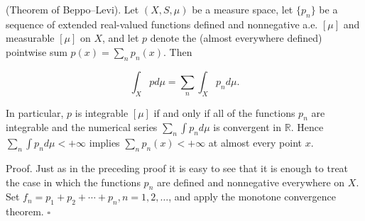 (Theorem of Beppo–Levi). Let $(X, S, \mu)$ be a measure space, let $\{p_n\}$ be a sequence of extended real-valued functions defined and nonnegative a.e. $[\mu]$ and measurable $[\mu]$ on $X$, and let $p$ denote the (almost everywhere defined) pointwise sum $p(x) = \sum_n p_n(x)$. Then

$$\int_X p d\mu = \sum_n \int_X p_n d\mu.$$

In particular, $p$ is integrable $[\mu]$ if and only if all of the functions $p_n$ are integrable and the numerical series $\sum_n \int p_n d\mu$ is convergent in $\mathbb{R}$. Hence $\sum_n \int p_n d\mu < +\infty$ implies $\sum_n p_n(x) < +\infty$ at almost every point $x$.

Proof. Just as in the preceding proof it is easy to see that it is enough to treat the case in which the functions $p_n$ are defined and nonnegative everywhere on $X$. Set $f_n = p_1 + p_2 + \cdots + p_n, n = 1, 2, \ldots$, and apply the monotone convergence theorem. $\square$

